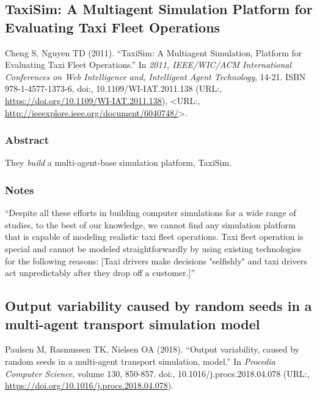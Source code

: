 \documentclass[]{article}
\begin{document}
\hypertarget{taxisim-a-multiagent-simulation-platform-for-evaluating-taxi-fleet-operations}{%
\subsection{TaxiSim: A Multiagent Simulation Platform for Evaluating
Taxi Fleet
Operations}\label{taxisim-a-multiagent-simulation-platform-for-evaluating-taxi-fleet-operations}}

Cheng S, Nguyen TD (2011). ``TaxiSim: A Multiagent Simulation, Platform
for Evaluating Taxi Fleet Operations.'' In \emph{2011, IEEE/WIC/ACM
International Conferences on Web Intelligence and, Intelligent Agent
Technology}, 14-21. ISBN 978-1-4577-1373-6, doi:,
10.1109/WI-IAT.2011.138 (URL:,
\url{https://doi.org/10.1109/WI-IAT.2011.138}), \textless URL:,
\url{http://ieeexplore.ieee.org/document/6040748/}\textgreater.

\hypertarget{abstract-4}{%
\subsubsection{Abstract}\label{abstract-4}}

They \emph{build} a multi-agent-base simulation platform, TaxiSim.

\hypertarget{notes-4}{%
\subsubsection{Notes}\label{notes-4}}

``Despite all these efforts in building computer simulations for a wide
range of studies, to the best of our knowledge, we cannot find any
simulation platform that is capable of modeling realistic taxi fleet
operations. Taxi fleet operation is special and cannot be modeled
straightforwardly by using existing technologies for the following
reasons: {[}Taxi drivers make decisions "selfishly" and taxi drivers act
unpredictably after they drop off a customer.{]}''

\hypertarget{output-variability-caused-by-random-seeds-in-a-multi-agent-transport-simulation-model}{%
\subsection{Output variability caused by random seeds in a multi-agent
transport simulation
model}\label{output-variability-caused-by-random-seeds-in-a-multi-agent-transport-simulation-model}}

Paulsen M, Rasmussen TK, Nielsen OA (2018). ``Output variability, caused
by random seeds in a multi-agent transport simulation, model.'' In
\emph{Procedia Computer Science}, volume 130, 850-857. doi:,
10.1016/j.procs.2018.04.078 (URL:,
\url{https://doi.org/10.1016/j.procs.2018.04.078}).
\end{document}
